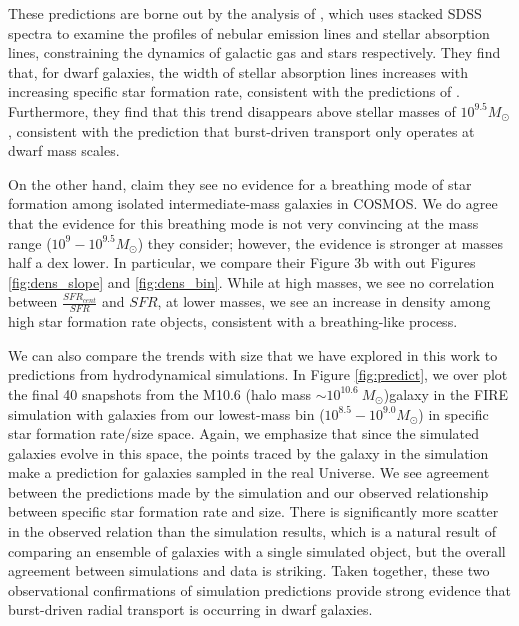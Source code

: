 \documentclass[iop]{emulateapj}
\begin{document}
These predictions are borne out by the analysis of \cite{Cicone16}, which uses stacked SDSS spectra to examine the profiles of nebular emission lines and stellar absorption lines, constraining the dynamics of galactic gas and stars respectively. They find that, for dwarf galaxies, the width of stellar absorption lines increases with increasing specific star formation rate, consistent with the predictions of \cite{El-Badry17}. Furthermore, they find that this trend disappears above stellar masses of $10^{9.5} M_{\odot}$, consistent with the prediction that burst-driven transport only operates at dwarf mass scales.

On the other hand, \cite{Patel18} claim they see no evidence for a breathing mode of star formation among isolated intermediate-mass galaxies in COSMOS. We do agree that the evidence for this breathing mode is not very convincing at the mass range ($10^{9}-10^{9.5} M_{\odot}$) they consider; however, the evidence is stronger at masses half a dex lower. In particular, we compare their Figure 3b with out Figures \ref{fig:dens_slope} and \ref{fig:dens_bin}. While at high masses, we see no correlation between $\frac{SFR_{cent}}{SFR}$ and $SFR$, at lower masses, we see an increase in density among high star formation rate objects, consistent with a breathing-like process.

We can also compare the trends with size that we have explored in this work to predictions from hydrodynamical simulations. In Figure \ref{fig:predict}, we over plot the final 40 snapshots from the M10.6 (halo mass $\sim 10^{10.6} \  M_{\odot}$)galaxy in the FIRE simulation with galaxies from our lowest-mass bin ($10^{8.5}-10^{9.0} M_{\odot}$) in specific star formation rate/size space. Again, we emphasize that since the simulated galaxies evolve in this space, the points traced by the galaxy in the simulation make a prediction for galaxies sampled in the real Universe. We see agreement between the predictions made by the simulation and our observed relationship between specific star formation rate and size. There is significantly more scatter in the observed relation than the simulation results, which is a natural result of comparing an ensemble of galaxies with a single simulated object, but the overall agreement between simulations and data is striking. Taken together, these two observational confirmations of simulation predictions provide strong evidence that burst-driven radial transport is occurring in dwarf galaxies.
\end{document}
